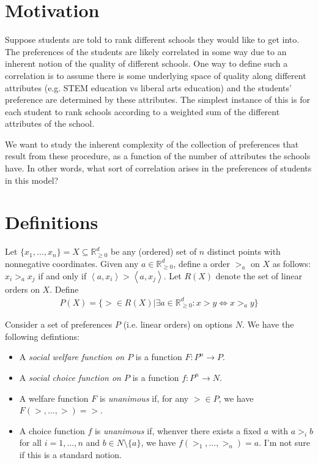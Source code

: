 \documentclass[12pt]{article}
\newcommand{\Rgz}{\mathbb{R}_{\ge 0}}
\newcommand{\ip}[2]{\left\langle{#1},{#2}\right\rangle}
\newcommand{\1}[1]{\mathds{1}[{#1}]}
\begin{document}
\section{Motivation}
  Suppose students are told to rank different schools they would like to
  get into. The preferences of the students are likely correlated in some
  way due to an inherent notion of the quality of different schools.
  One way to define such a correlation is to assume there is some underlying
  space of quality along different attributes (e.g. STEM education vs
  liberal arts education) and the students' preference
  are determined by these attributes.
  The simplest instance of this is for each student to rank schools
  according to a weighted sum of the different attributes of the school.

  We want to study the inherent complexity of the collection of preferences
  that result from these procedure, as a function of the number of attributes
  the schools have. In other words, what sort of correlation arises in the
  preferences of students in this model?


\section{Definitions}

  Let $\{x_1,\ldots,x_n\} = X\subseteq \Rgz^d$ be any (ordered) set of 
  $n$ distinct points with nonnegative coordinates.
  Given any $a\in \Rgz^d$, define a order $>_a$ on $X$ as follows:
  $x_i >_a x_j$ if and only if $\ip{a}{x_i} > \ip{a}{x_j}$.
  Let $R(X)$ denote the set of linear orders on $X$.
  Define
  \begin{align*}
    P(X) = \{ >\in R(X) | \exists a\in\Rgz^d: x > y \iff x >_a y\}
  \end{align*}

  Consider a set of preferences $P$ (i.e. linear orders) on options $N$.
  We have the following defintions:
  \begin{itemize}
    \item A \emph{social welfare function on $P$}
      is a function $F : P^n \to P$.
    \item A \emph{social choice function on $P$} 
      is a function $f : P^n \to N$.
    \item A welfare function $F$ is \emph{unanimous} if,
      for any $> \in P$, we have $F(>,\ldots,>) = >$.
    \item A choice function $f$ is \emph{unanimous} if,
      whenver there exists a fixed $a$ with $a >_i b$ for all 
      $i=1,\ldots, n$ and $b\in N\setminus \{a\}$,
      we have $f(>_1,\ldots,>_n) = a$.
      I'm not sure if this is a standard notion.

  \end{itemize}
\end{document}
